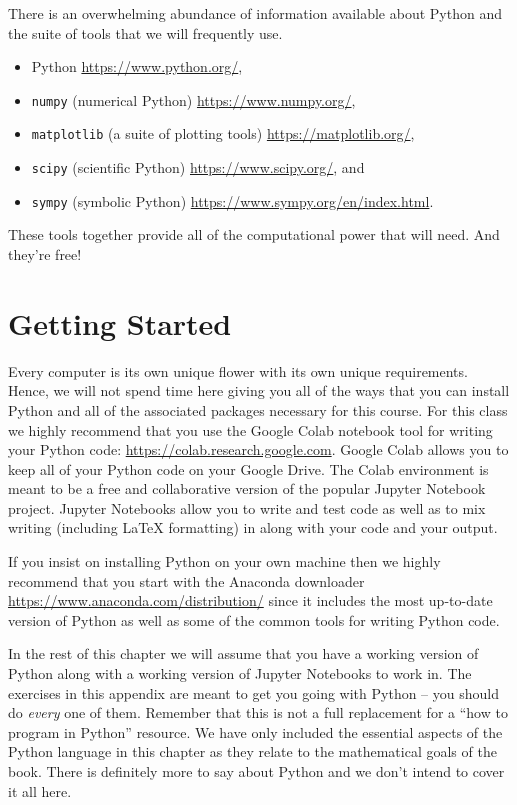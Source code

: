 \documentclass[
]{book}
\providecommand{\tightlist}{%
  \setlength{\itemsep}{0pt}\setlength{\parskip}{0pt}}
\theoremstyle{definition}
\theoremstyle{definition}
\theoremstyle{definition}
\theoremstyle{remark}
\begin{document}
There is an overwhelming abundance of information available about Python and the suite of tools that we will frequently use.

\begin{itemize}
\tightlist
\item
  Python \url{https://www.python.org/},
\item
  \texttt{numpy} (numerical Python) \url{https://www.numpy.org/},
\item
  \texttt{matplotlib} (a suite of plotting tools) \url{https://matplotlib.org/},
\item
  \texttt{scipy} (scientific Python) \url{https://www.scipy.org/}, and
\item
  \texttt{sympy} (symbolic Python) \url{https://www.sympy.org/en/index.html}.
\end{itemize}

These tools together provide all of the computational power that will need. And they're free!

\hypertarget{getting-started}{%
\section{Getting Started}\label{getting-started}}

Every computer is its own unique flower with its own unique requirements. Hence, we will not spend time here giving you all of the ways that you can install Python and all of the associated packages
necessary for this course. For this class we highly recommend that you use the Google Colab notebook tool for writing your Python code: \url{https://colab.research.google.com}. Google Colab allows you to keep all of your Python code on your Google Drive. The Colab environment is meant to be a free and collaborative version of the popular Jupyter Notebook project. Jupyter Notebooks allow you to write and test code as well as to mix writing (including LaTeX formatting) in along with your code and your output.

If you insist on installing Python on your own machine then we highly recommend that you start with the Anaconda downloader \url{https://www.anaconda.com/distribution/} since it includes the most up-to-date version of Python as well as some of the common tools for writing Python code.

In the rest of this chapter we will assume that you have a working version of Python along with a working version of Jupyter Notebooks to work in. The exercises in this appendix are meant to get you going with Python -- you should do \emph{every} one of them. Remember that this is not a full replacement for a ``how to program in Python'' resource. We have only included the essential aspects of the Python language in this chapter as they relate to the mathematical goals of the book. There is definitely more to say about Python and we don't intend to cover it all here.
\end{document}
